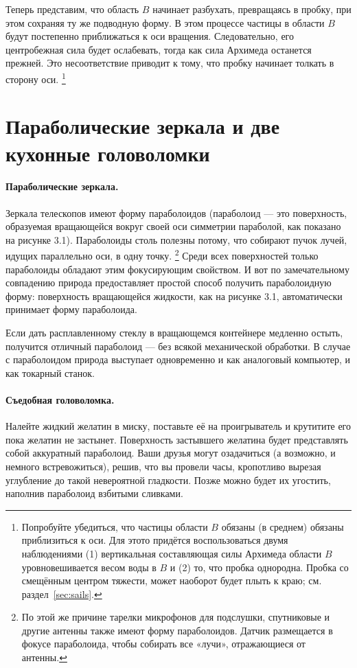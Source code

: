 Теперь представим, что область $B$ начинает разбухать, превращаясь в пробку, при этом сохраняя ту же подводную форму.
В этом процессе частицы в области $B$ будут постепенно приближаться к оси вращения.
Следовательно, его центробежная сила будет ослабевать, тогда как сила Архимеда останется прежней.
Это несоответствие приводит к тому, что пробку начинает толкать в сторону оси.%
\footnote{Попробуйте убедиться, что частицы области $B$ обязаны (в среднем) обязаны приблизиться к оси.
Для этото придётся воспользоваться двумя наблюдениями
(1) вертикальная составляющая силы Архимеда области $B$ уровновешивается весом воды в $B$ и
(2) то, что пробка однородна.
Пробка со смещённым центром тяжести, может наоборот будет плыть к краю;
см. раздел~\ref{sec:sails}.
\pr}

\section{Параболические зеркала и две кухонные головоломки}

\paragraph*{Параболические зеркала.}
Зеркала телескопов имеют форму параболоидов (параболоид — это поверхность, образуемая вращающейся вокруг своей оси симметрии параболой, как показано на рисунке 3.1).
Параболоиды столь полезны потому, что собирают пучок лучей, идущих параллельно оси, в одну точку.%
\footnote{По этой же причине тарелки микрофонов для подслушки, спутниковые и другие антенны также имеют форму параболоидов.
Датчик размещается в фокусе параболоида, чтобы собирать все «лучи», отражающиеся от антенны.}
Среди всех поверхностей только параболоиды обладают этим фокусирующим свойством.
И вот по замечательному совпадению природа предоставляет простой способ получить параболоидную форму: поверхность вращающейся жидкости, как на рисунке 3.1, автоматически принимает форму параболоида.

Если дать расплавленному стеклу в вращающемся контейнере медленно остыть, получится отличный параболоид — без всякой механической обработки.
В случае с параболоидом природа выступает одновременно и как аналоговый компьютер, и как токарный станок.

\paragraph*{Съедобная головоломка.}
Налейте жидкий желатин в миску, поставьте её на проигрыватель и крутитите его пока желатин не застынет. Поверхность застывшего желатина будет представлять собой аккуратный параболоид.
Ваши друзья могут озадачиться (а возможно, и немного встревожиться), решив, что вы провели часы, кропотливо вырезая углубление до такой невероятной гладкости.
Позже можно будет их угостить, наполнив параболоид взбитыми сливками.

